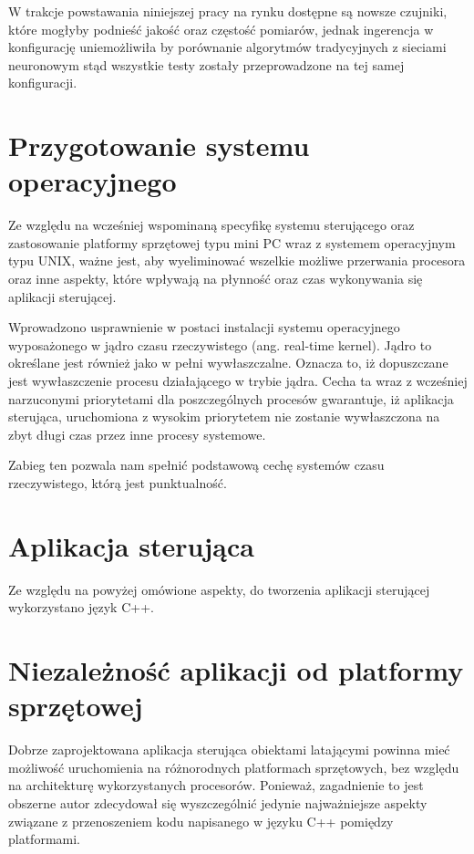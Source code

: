 W trakcje powstawania niniejszej pracy na rynku dostępne są nowsze czujniki, które mogłyby podnieść jakość oraz częstość pomiarów, jednak ingerencja w konfigurację uniemożliwiła by porównanie algorytmów tradycyjnych z sieciami neuronowym stąd wszystkie testy zostały przeprowadzone na tej samej konfiguracji.




\section{Przygotowanie systemu operacyjnego}
Ze względu na wcześniej wspominaną specyfikę systemu sterującego oraz zastosowanie platformy sprzętowej typu mini PC wraz z systemem operacyjnym typu UNIX, ważne jest, aby wyeliminować wszelkie możliwe przerwania procesora oraz inne aspekty, które wpływają na płynność oraz czas wykonywania się aplikacji sterującej.

Wprowadzono usprawnienie w postaci instalacji systemu operacyjnego wyposażonego w jądro czasu rzeczywistego (ang. real-time kernel). Jądro to określane jest również jako w pełni wywłaszczalne. Oznacza to, iż dopuszczane jest wywłaszczenie procesu działającego w trybie jądra. Cecha ta wraz z wcześniej narzuconymi priorytetami dla poszczególnych procesów gwarantuje, iż aplikacja sterująca, uruchomiona z wysokim priorytetem nie zostanie wywłaszczona na zbyt długi czas przez inne procesy systemowe.


Zabieg ten pozwala nam spełnić podstawową cechę systemów czasu rzeczywistego, którą jest punktualność.

\section{Aplikacja sterująca}

Ze względu na powyżej omówione aspekty, do tworzenia aplikacji sterującej wykorzystano język C++. 



\section{Niezależność aplikacji od platformy sprzętowej}
Dobrze zaprojektowana aplikacja sterująca obiektami latającymi powinna mieć możliwość uruchomienia na różnorodnych platformach sprzętowych, bez względu na architekturę wykorzystanych procesorów. Ponieważ, zagadnienie to jest obszerne autor zdecydował się wyszczególnić jedynie najważniejsze aspekty związane z przenoszeniem kodu napisanego w języku C++ pomiędzy platformami. 

